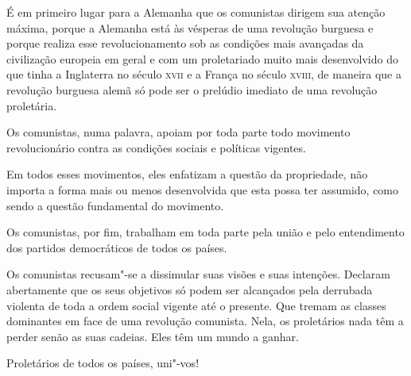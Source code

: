 É em primeiro lugar para a Alemanha que os comunistas dirigem sua
atenção máxima, porque a Alemanha está às vésperas de uma revolução
burguesa e porque realiza esse revolucionamento sob as condições mais
avançadas da civilização europeia em geral e com um proletariado muito
mais desenvolvido do que tinha a Inglaterra no século \textsc{xvii} e a França
no século \textsc{xviii}, de maneira que a revolução burguesa alemã só pode
ser o prelúdio imediato de uma revolução proletária.

Os comunistas, numa palavra, apoiam por toda parte todo movimento
revolucionário contra as condições sociais e políticas vigentes.

Em todos esses movimentos, eles enfatizam a questão da propriedade, não
importa a forma mais ou menos desenvolvida que esta possa ter assumido,
como sendo a questão fundamental do movimento.

Os comunistas, por fim, trabalham em toda parte pela união e pelo
entendimento dos partidos democráticos de todos os países.

Os comunistas recusam"-se a dissimular suas visões e suas intenções.
Declaram abertamente que os seus objetivos só podem ser alcançados pela
derrubada violenta de toda a ordem social vigente até o presente. Que
tremam as classes dominantes em face de uma revolução comunista. Nela,
os proletários nada têm a perder senão as suas cadeias. Eles têm um
mundo a ganhar.

Proletários de todos os países, uni"-vos!



